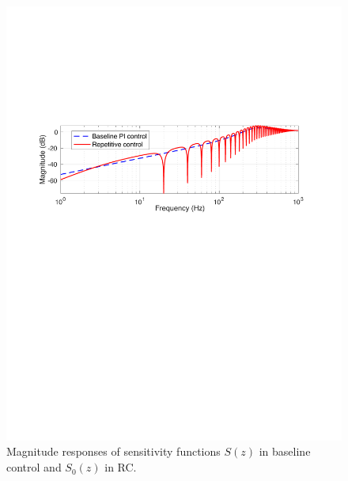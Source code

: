 \documentclass [11pt, proquest] {uwthesis}[2020/02/24]
\begin{document}
\begin{figure}[!ht]
\begin{centering}
\includegraphics[clip,width=13cm]{Closed-loop-simulation/Sensitivity_func_baseline_rc}
\par\end{centering}
\centering{}\caption{\label{fig:Magnitude-responses-of-3}Magnitude responses of sensitivity
functions $S(z)$ in baseline control and $S_{0}(z)$ in RC.}
\end{figure}
\end{document}
